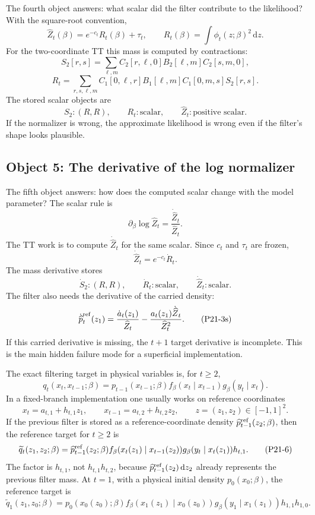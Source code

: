 \documentclass[11pt]{article}
\newcommand{\dd}{\,\mathrm d}
\newcommand{\widehatp}{\widehat p}
\begin{document}
The fourth object answers: what scalar did the filter contribute to the
likelihood?  With the square-root convention,
\[
    \widehat Z_t(\beta)
    =
    e^{-c_t}R_t(\beta)+\tau_t,
    \qquad
    R_t(\beta)=\int\phi_t(z;\beta)^2\dd z.
    \tag{P21-3l}
\]
For the two-coordinate TT this mass is computed by contractions:
\[
    S_2[r,s]
    =
    \sum_{\ell,m}
    C_2[r,\ell,0]B_2[\ell,m]C_2[s,m,0],
    \tag{P21-3m}
\]
\[
    R_t
    =
    \sum_{r,s,\ell,m}
    C_1[0,\ell,r]B_1[\ell,m]C_1[0,m,s]S_2[r,s].
    \tag{P21-3n}
\]
The stored scalar objects are
\[
    S_2:(R,R),\qquad R_t:\text{scalar},\qquad
    \widehat Z_t:\text{positive scalar}.
    \tag{P21-3o}
\]
If the normalizer is wrong, the approximate likelihood is wrong even if the
filter's shape looks plausible.

\subsection{Object 5: The derivative of the log normalizer}

The fifth object answers: how does the computed scalar change with the model
parameter?  The scalar rule is
\[
    \partial_\beta\log\widehat Z_t
    =
    \frac{\dot{\widehat Z}_t}{\widehat Z_t}.
    \tag{P21-3p}
\]
The TT work is to compute \(\dot{\widehat Z}_t\) for the same scalar.  Since
\(c_t\) and \(\tau_t\) are frozen,
\[
    \dot{\widehat Z}_t
    =
    e^{-c_t}\dot R_t.
    \tag{P21-3q}
\]
The mass derivative stores
\[
    \dot S_2:(R,R),\qquad \dot R_t:\text{scalar},
    \qquad \dot{\widehat Z}_t:\text{scalar}.
    \tag{P21-3r}
\]
The filter also needs the derivative of the carried density:
\[
    \dot{\widehat p}^{\rm ref}_t(z_1)
    =
    \frac{\dot a_t(z_1)}{\widehat Z_t}
    -
    \frac{a_t(z_1)\dot{\widehat Z}_t}{\widehat Z_t^2}.
    \tag{P21-3s}
\]
If this carried derivative is missing, the \(t+1\) target derivative is
incomplete.  This is the main hidden failure mode for a superficial
implementation.

The exact filtering target in physical variables is, for \(t\ge 2\),
\[
    q_t(x_t,x_{t-1};\beta)
    =
    p_{t-1}(x_{t-1};\beta)
    f_\beta(x_t\mid x_{t-1})
    g_\beta(y_t\mid x_t).
    \tag{P21-4}
\]
In a fixed-branch implementation one usually works on reference coordinates
\[
    x_{t}=a_{t,1}+h_{t,1}z_1,\qquad
    x_{t-1}=a_{t,2}+h_{t,2}z_2,\qquad z=(z_1,z_2)\in[-1,1]^2.
    \tag{P21-5}
\]
If the previous filter is stored as a reference-coordinate density
\(\widehatp_{t-1}^{\rm ref}(z_2;\beta)\), then the reference target for
\(t\ge2\) is
\[
    \widetilde q_t(z_1,z_2;\beta)
    =
    \widehatp_{t-1}^{\rm ref}(z_2;\beta)
    f_\beta(x_t(z_1)\mid x_{t-1}(z_2))
    g_\beta(y_t\mid x_t(z_1))
    h_{t,1}.
    \tag{P21-6}
\]
The factor is \(h_{t,1}\), not \(h_{t,1}h_{t,2}\), because
\(\widehatp_{t-1}^{\rm ref}(z_2)\dd z_2\) already represents the previous
filter mass.  At \(t=1\), with a physical initial density \(p_0(x_0;\beta)\),
the reference target is
\[
    \widetilde q_1(z_1,z_0;\beta)
    =
    p_0(x_0(z_0);\beta)
    f_\beta(x_1(z_1)\mid x_0(z_0))
    g_\beta(y_1\mid x_1(z_1))
    h_{1,1}h_{1,0}.
    \tag{P21-7}
\]
\end{document}

